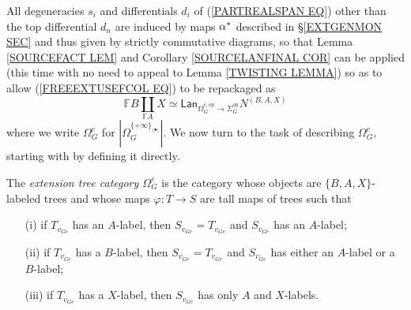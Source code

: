 \documentclass[a4paper,10pt]{article}%
\begin{document}
All degeneracies $s_i$ and differentials $d_i$ of 
(\ref{PARTREALSPAN EQ}) other than the top differential $d_n$ are induced by maps $\alpha^{\**}$ described in \S \ref{EXTGENMON SEC} and thus given by strictly commutative diagrams, so that Lemma \ref{SOURCEFACT LEM} and Corollary \ref{SOURCELANFINAL COR} can be applied (this time with no need to appeal to Lemma \ref{TWISTING LEMMA}) so as to allow 
(\ref{FREEEXTUSEFCOL EQ}) to be repackaged as 
\begin{equation}\label{FREEEXTUSEFCOLNEW EQ}
	\mathbb{F} B \coprod_{\mathbb{F} A} X
\simeq
	\mathsf{Lan}_{\Omega_G^{e,op} \to \Sigma_G^{op}} 
	N^{(B,A,X)}
\end{equation}
where we write $\Omega_G^e$ for 
$|\Omega_{G}^{\{+\infty\}_{\langle \bullet \rangle}}|$.
We now turn to the task of describing $\Omega_G^e$, starting with by defining it directly.

\begin{definition}\label{EXTTREECAT DEF}
	The \textit{extension tree category $\Omega_G^e$} is the category whose objects are $\{B,A,X\}$-labeled trees and whose maps $\varphi \colon T \to S$ are tall maps of trees such that
	\begin{itemize}
		\item[(i)] if $T_{v_{Ge}}$ has an $A$-label, then 
		$S_{v_{Ge}}=T_{v_{Ge}}$ and $S_{v_{Ge}}$ has an $A$-label;
		\item[(ii)] if $T_{v_{Ge}}$ has a $B$-label, then 
		$S_{v_{Ge}}=T_{v_{Ge}}$ and $S_{v_{Ge}}$ has either an $A$-label or a $B$-label;
		\item[(iii)] if $T_{v_{Ge}}$ has a $X$-label, then 
		$S_{v_{Ge}}$ has only $A$ and $X$-labels.
	\end{itemize}
\end{definition}
\end{document}
